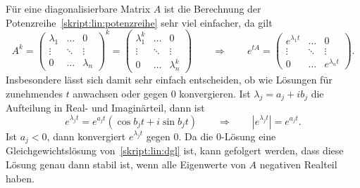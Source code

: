 Für eine diagonalisierbare Matrix $A$ ist die Berechnung der
Potenzreihe~\eqref{skript:lin:potenzreihe} sehr viel einfacher, da
gilt
\begin{equation}
A^k
=
\begin{pmatrix}
\lambda_1&\dots &0        \\
\vdots   &\ddots&\vdots   \\
0        &\dots &\lambda_n
\end{pmatrix}^k
=
\begin{pmatrix}
\lambda_1^k&\dots &0        \\
\vdots     &\ddots&\vdots   \\
0          &\dots &\lambda_n^k
\end{pmatrix}
\qquad\Rightarrow\qquad
e^{tA}
=
\begin{pmatrix}
e^{\lambda_1 t} & \dots  & 0             \\
\vdots          & \ddots &\vdots         \\
0               & \dots  &e^{\lambda_n t}
\end{pmatrix}.
\label{skript:lin:expreihe}
\end{equation}
Insbesondere lässt sich damit sehr einfach entscheiden, ob wie Lösungen
für zunehmendes $t$ anwachsen oder gegen $0$ konvergieren.
Ist $\lambda_j = a_j + ib_j$ die Aufteilung in Real- und Imaginärteil,
dann ist
\[
e^{\lambda_jt} = e^{a_jt}(\cos b_jt +i\sin b_jt)
\qquad\Rightarrow\qquad
|e^{\lambda_j t}| = e^{a_jt}.
\]
Ist $a_j < 0$, dann konvergiert $e^{\lambda_jt}$ gegen $0$.
Da die $0$-Lösung eine Gleichgewichtslösung von~\eqref{skript:lin:dgl}
ist, kann gefolgert werden, dass diese Lösung genau dann stabil ist, 
wenn alle Eigenwerte von $A$ negativen Realteil haben.

